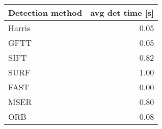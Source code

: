 \begin{tabular}{ l| r }
\label{tab_dettimes}
	Detection method & avg det time [s] \\
	\hline
	 Harris & 0.05 \\
	 GFTT & 0.05 \\
	 SIFT & 0.82 \\
	 SURF & 1.00 \\
	 FAST & 0.00 \\
	 MSER & 0.80 \\
	 ORB & 0.08
\end{tabular}
